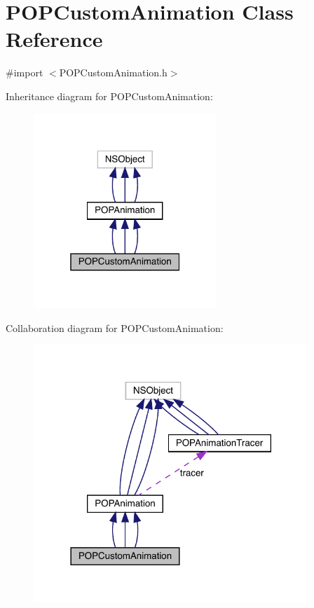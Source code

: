 \hypertarget{interface_p_o_p_custom_animation}{}\section{P\+O\+P\+Custom\+Animation Class Reference}
\label{interface_p_o_p_custom_animation}


{\ttfamily \#import $<$P\+O\+P\+Custom\+Animation.\+h$>$}



Inheritance diagram for P\+O\+P\+Custom\+Animation\+:\nopagebreak
\begin{figure}[H]
\begin{center}
\leavevmode
\includegraphics[width=196pt]{interface_p_o_p_custom_animation__inherit__graph}
\end{center}
\end{figure}


Collaboration diagram for P\+O\+P\+Custom\+Animation\+:\nopagebreak
\begin{figure}[H]
\begin{center}
\leavevmode
\includegraphics[width=294pt]{interface_p_o_p_custom_animation__coll__graph}
\end{center}
\end{figure}
